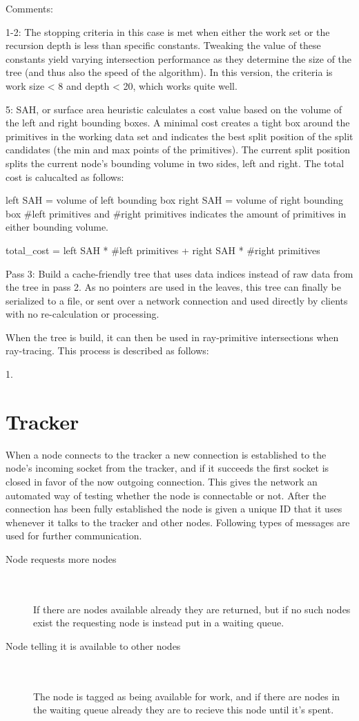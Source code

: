 Comments: 

1-2: The stopping criteria in this case is met when either the work set or the recursion depth is less than specific constants. Tweaking the value of these constants yield varying intersection performance as they determine the size of the tree (and thus also the speed of the algorithm). In this version, the criteria is work size < 8 and depth < 20, which works quite well.

5: SAH, or surface area heuristic calculates a cost value based on the volume of the left and right bounding boxes. A minimal cost creates a tight box around the primitives in the working data set and indicates the best split position of the split candidates (the min and max points of the primitives). The current split position splits the current node's bounding volume in two sides, left and right. The total cost is calucalted as follows: 

left SAH = volume of left bounding box
right SAH = volume of right bounding box
#left primitives and #right primitives indicates the amount of primitives in either bounding volume. 

total_cost = left SAH * #left primitives + right SAH * #right primitives

Pass 3: Build a cache-friendly tree that uses data indices instead of raw data from the tree in pass 2. As no pointers are used in the leaves, this tree can finally be serialized to a file, or sent over a network connection and used directly by clients with no re-calculation or processing.

When the tree is build, it can then be used in ray-primitive intersections when ray-tracing. This process is described as follows:

1. 

\section{Tracker}
When a node connects to the tracker a new connection is established to the node's incoming socket from the tracker, and if it succeeds the first socket is closed in favor of the now outgoing connection.
This gives the network an automated way of testing whether the node is connectable or not.
After the connection has been fully established the node is given a unique ID that it uses whenever it talks to the tracker and other nodes.
Following types of messages are used for further communication.

\begin{description}
\item[Node requests more nodes] \hfill \\\\
If there are nodes available already they are returned, but if no such nodes exist the requesting node is instead put in a waiting queue.
\item[Node telling it is available to other nodes] \hfill \\\\
The node is tagged as being available for work, and if there are nodes in the waiting queue already they are to recieve this node until it's spent.
\end{description}

